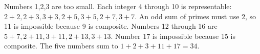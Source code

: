 Numbers 1,2,3 are too small. Each integer 4 through 10 is representable: $2+2,2+3,3+3,2+5,3+5,2+7,3+7$. An odd sum of primes must use 2, so 11 is impossible because 9 is composite. Numbers 12 through 16 are $5+7,2+11,3+11,2+13,3+13$. Number 17 is impossible because 15 is composite. The five numbers sum to $1+2+3+11+17=\boxed{34}$.
